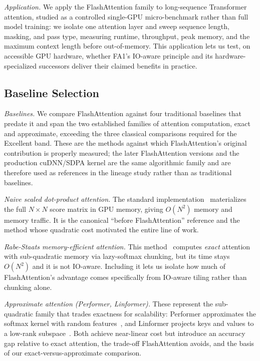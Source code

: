 \documentclass[sigconf,nonacm]{acmart}
\newcommand{\lead}[1]{\textit{#1}\quad}
\begin{document}
\lead{Application.}
We apply the FlashAttention family to long-sequence Transformer attention,
studied as a controlled single-GPU micro-benchmark rather than full model
training: we isolate one attention layer and sweep sequence length, masking, and
pass type, measuring runtime, throughput, peak memory, and the maximum context
length before out-of-memory. This application lets us
test, on accessible GPU hardware, whether FA1's IO-aware principle and its
hardware-specialized successors deliver their claimed benefits in practice.

\subsection{Baseline Selection}
\label{subsec:baselines}
\lead{Baselines.}
We compare FlashAttention against four traditional baselines that predate it and
span the two established families of attention computation, exact and
approximate, exceeding the three classical comparisons required for the Excellent
band. These are
the methods against which FlashAttention's original contribution is properly
measured; the later FlashAttention versions and the production cuDNN/SDPA kernel
are the same algorithmic family and are therefore used as references in the
lineage study rather than as traditional baselines.

\lead{Naive scaled dot-product attention.}
The standard implementation~\cite{vaswani2017attention} materializes the full
$N\times N$ score matrix in GPU memory, giving $O(N^2)$ memory and memory traffic.
It is the canonical ``before FlashAttention'' reference and the method whose
quadratic cost motivated the entire line of work.

\lead{Rabe-Staats memory-efficient attention.}
This method~\cite{rabe2021selfattention} computes \emph{exact} attention with
sub-quadratic memory via lazy-softmax chunking, but its time stays $O(N^2)$ and
it is not IO-aware. Including it lets us isolate how much of FlashAttention's
advantage comes specifically from IO-aware tiling rather than chunking alone.

\lead{Approximate attention (Performer, Linformer).}
These represent the sub-quadratic family that trades exactness for scalability:
Performer approximates the softmax kernel with random
features~\cite{choromanski2021performer}, and Linformer projects keys and values
to a low-rank subspace~\cite{wang2020linformer}. Both achieve near-linear cost
but introduce an accuracy gap relative to exact attention, the trade-off
FlashAttention avoids, and the basis of our exact-versus-approximate comparison.
\end{document}
